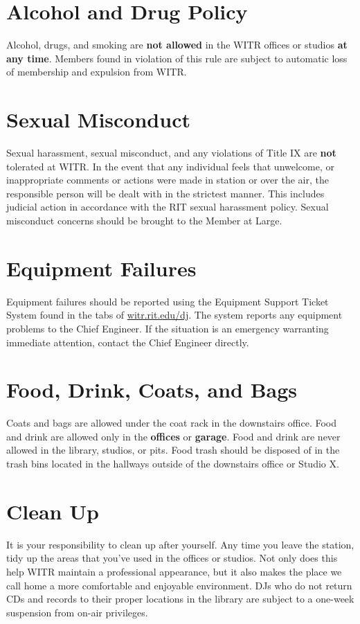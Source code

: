 \documentclass{witrman}
\begin{document}
\section{Alcohol and Drug Policy}
Alcohol, drugs, and smoking are \textbf{not allowed} in the WITR offices or
studios \textbf{at any time}. Members found in violation of this rule are
subject to automatic loss of membership and expulsion from WITR.

\section{Sexual Misconduct}
Sexual harassment, sexual misconduct, and any violations of Title IX are
\textbf{not} tolerated at WITR. In the event that any individual feels that
unwelcome, or inappropriate comments or actions were made in station or over the
air, the responsible person will be dealt with in the strictest manner. This
includes judicial action in accordance with the RIT sexual harassment policy.
Sexual misconduct concerns should be brought to the Member at Large.

\section{Equipment Failures}
Equipment failures should be reported using the Equipment Support Ticket System
found in the tabs of \href{https://witr.rit.edu/dj}{witr.rit.edu/dj}. The system
reports any equipment problems to the Chief Engineer. If the situation is an
emergency warranting immediate attention, contact the Chief Engineer directly.

\section{Food, Drink, Coats, and Bags}
Coats and bags are allowed under the coat rack in the downstairs office. Food
and drink are allowed only in the \textbf{offices} or \textbf{garage}. Food and
drink are never allowed in the library, studios, or pits. Food trash should be
disposed of in the trash bins located in the hallways outside of the downstairs
office or Studio X.

\section{Clean Up}
It is your responsibility to clean up after yourself. Any time you leave the
station, tidy up the areas that you've used in the offices or studios. Not only
does this help WITR maintain a professional appearance, but it also makes the
place we call home a more comfortable and enjoyable environment. DJs who do not
return CDs and records to their proper locations in the library are subject to a
one-week suspension from on-air privileges.
\end{document}
